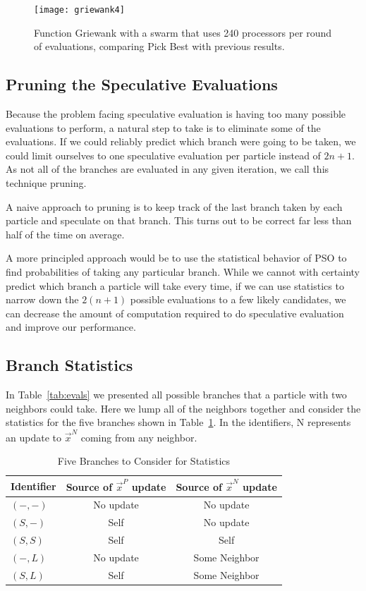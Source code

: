 \documentclass[journal,letterpaper]{IEEEtran}
\providecommand{\pers}{\ensuremath{P}}
\providecommand{\neigh}{\ensuremath{N}}
\providecommand{\leftind}{\ensuremath{L}}
\providecommand{\nbest}{\ensuremath{\Vec{x}^\neigh}}
\providecommand{\pbest}{\ensuremath{\Vec{x}^\pers}}
\providecommand{\casexn}{\ensuremath{(S,-)}}
\providecommand{\casexx}{\ensuremath{(S,S)}}
\providecommand{\casexl}{\ensuremath{(S,\leftind)}}
\providecommand{\casepn}{\ensuremath{(-,-)}}
\providecommand{\casepl}{\ensuremath{(-,\leftind)}}
\begin{document}
\begin{figure}
  \centering
  \texttt{[image: griewank4]}
  \caption{Function Griewank with a swarm that uses 240 processors per round of
  evaluations, comparing Pick Best with previous results.}
  \label{fig:griewank-pickbest}
\end{figure}

\subsection{Pruning the Speculative Evaluations}
\label{sec:pruning}

Because the problem facing speculative evaluation is having too many possible
evaluations to perform, a natural step to take is to eliminate some of the
evaluations.  If we could reliably predict which branch were going to be taken,
we could limit ourselves to one speculative evaluation per particle instead of
$2n+1$.  As not all of the branches are evaluated in any given iteration, we
call this technique pruning.  

A naive approach to pruning is to keep track of the last branch taken by each
particle and speculate on that branch.  This turns out to be correct far less
than half of the time on average.

A more principled approach would be to use the statistical behavior of PSO to
find probabilities of taking any particular branch.  While we cannot with
certainty predict which branch a particle will take every time, if we can use
statistics to narrow down the $2(n+1)$ possible evaluations to a few likely
candidates, we can decrease the amount of computation required to do
speculative evaluation and improve our performance.

\subsection{Branch Statistics}

In Table~\ref{tab:evals} we presented all possible branches that a particle
with two neighbors could take.  Here we lump all of the neighbors together and
consider the statistics for the five branches shown in
Table~\ref{tab:branches}.  In the identifiers, N represents an update to
$\nbest$ coming from any neighbor.

\begin{table}[ht]
  \caption{Five Branches to Consider for Statistics}
  \label{tab:branches}
  \centering
  \begin{tabular}{lcc}
	Identifier&Source of $\pbest$ update&Source of $\nbest$ update\\
	\hline
	\hline
	$\casepn$&No update&No update\\
	\hline
	$\casexn$&Self&No update\\
	\hline
	$\casexx$&Self&Self\\
	\hline
	$\casepl$&No update&Some Neighbor\\
	\hline
	$\casexl$&Self&Some Neighbor\\
	\hline
  \end{tabular}
\end{table}
\end{document}
